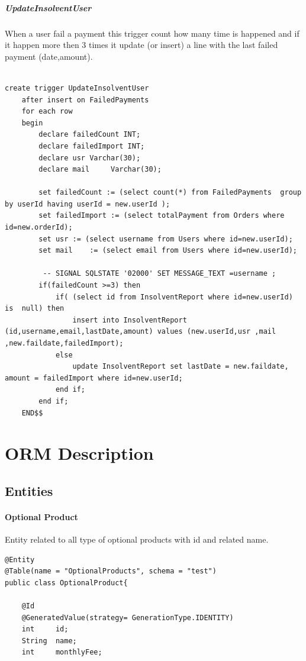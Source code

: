 \documentclass{article}
\begin{document}
\subparagraph{UpdateInsolventUser}
When a user fail a payment this trigger count how many time is happened and if it happen more then 3 times it update (or insert) a line with the last failed payment (date,amount).
\begin{lstlisting}

create trigger UpdateInsolventUser
    after insert on FailedPayments
	for each row
    begin
		declare failedCount INT;
        declare failedImport INT;
        declare usr Varchar(30);
        declare mail	 Varchar(30);

        set failedCount := (select count(*) from FailedPayments  group by userId having userId = new.userId );
        set failedImport := (select totalPayment from Orders where id=new.orderId);
        set usr := (select username from Users where id=new.userId);
        set mail    := (select email from Users where id=new.userId);
        
         -- SIGNAL SQLSTATE '02000' SET MESSAGE_TEXT =username ;
        if(failedCount >=3) then
			if( (select id from InsolventReport where id=new.userId) is  null) then
				insert into InsolventReport (id,username,email,lastDate,amount) values (new.userId,usr ,mail ,new.faildate,failedImport);
			else
				update InsolventReport set lastDate = new.faildate, amount = failedImport where id=new.userId;
			end if;
        end if;
    END$$
\end{lstlisting}
\newpage

\section{ORM Description}

\subsection{Entities}
\lstset{language=Java}
\paragraph{Optional Product}
Entity related to all type of optional products with id and related name.
\begin{lstlisting}
@Entity
@Table(name = "OptionalProducts", schema = "test")
public class OptionalProduct{

    @Id
    @GeneratedValue(strategy= GenerationType.IDENTITY)
    int     id;
    String  name;
    int     monthlyFee;
\end{lstlisting}
\end{document}
